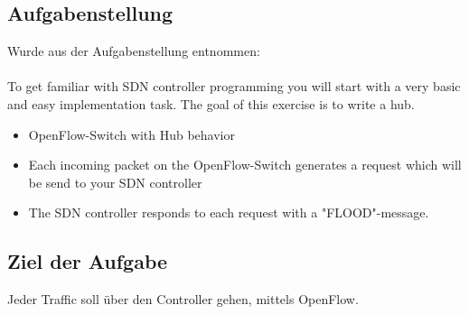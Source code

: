 \documentclass[a4,12pt]{scrartcl}
\begin{document}
\subsection{Aufgabenstellung}
Wurde aus der Aufgabenstellung entnommen: \\
\\
To get familiar with SDN controller programming you will start with a very basic and easy implementation task. The goal of this exercise is to write a hub.
\begin{itemize}
\item OpenFlow-Switch with Hub behavior
\item Each incoming packet on the OpenFlow-Switch generates a request which will be send to your SDN controller
\item The SDN controller responds to each request with a "FLOOD"-message.
\end{itemize}

\subsection{Ziel der Aufgabe}
Jeder Traffic soll über den Controller gehen, mittels OpenFlow. 
\end{document}
